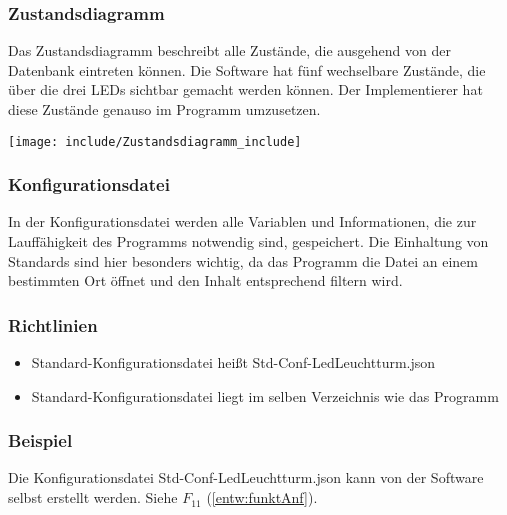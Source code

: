 \clearpage
\subsubsection{Zustandsdiagramm}
\label{entw:zstdia}
Das Zustandsdiagramm beschreibt alle Zustände, die ausgehend von der Datenbank eintreten können. Die Software hat fünf wechselbare Zustände, die über die drei LEDs sichtbar gemacht werden können. Der Implementierer hat diese Zustände genauso im Programm umzusetzen.
\begin{center}
\texttt{[image: include/Zustandsdiagramm\_include]}
\end{center}

\clearpage
\subsubsection{Konfigurationsdatei}
\label{entw:konf}
	In der Konfigurationsdatei werden alle Variablen und Informationen, die zur Lauffähigkeit des Programms notwendig sind, gespeichert. Die Einhaltung von Standards sind hier besonders wichtig, da das Programm die Datei an einem bestimmten Ort öffnet und den Inhalt entsprechend filtern wird.
\subsubsection*{Richtlinien}
\begin{itemize}
	\item Standard-Konfigurationsdatei heißt Std-Conf-LedLeuchtturm.json
	\item Standard-Konfigurationsdatei liegt im selben Verzeichnis wie das Programm
\end{itemize}

\subsubsection*{Beispiel}
\label{entw:konfbsp}
Die Konfigurationsdatei Std-Conf-LedLeuchtturm.json kann von der Software selbst erstellt werden. Siehe $F_11$ (\autoref{entw:funktAnf}). 

